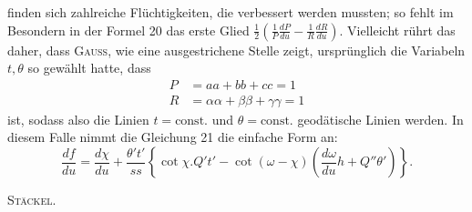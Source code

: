 %
finden sich zahlreiche Flüchtigkeiten, die verbessert werden mussten; so fehlt im Besondern in der Formel 20 das erste Glied $\tfrac12\left(\frac1P\frac{dP}{du}-\frac1R\frac{dR}{du}\right)$. Vielleicht rührt das daher, dass \textsc{Gauss}, wie eine ausgestrichene Stelle zeigt, ursprünglich die Variabeln $t,\theta$ so gewählt hatte, dass
\[
\begin{aligned}
P&=aa+bb+cc=1\\
R&=\alpha\alpha+\beta\beta+\gamma\gamma=1
\end{aligned}
\]
ist, sodass also die Linien $t=\text{const.}$ und $\theta=\text{const.}$ geodätische Linien werden. In diesem Falle nimmt die Gleichung 21 die einfache Form an:
\[
\frac{df}{du}=\frac{d\chi}{du}+\frac{\theta't'}{ss}\left\{\cot\chi.Q't'-\cot(\omega-\chi)\left(\frac{d\omega}{du}h+Q''\theta'\right)\right\}.
\]
\begin{flushright}\textsc{Stäckel.}\end{flushright}
